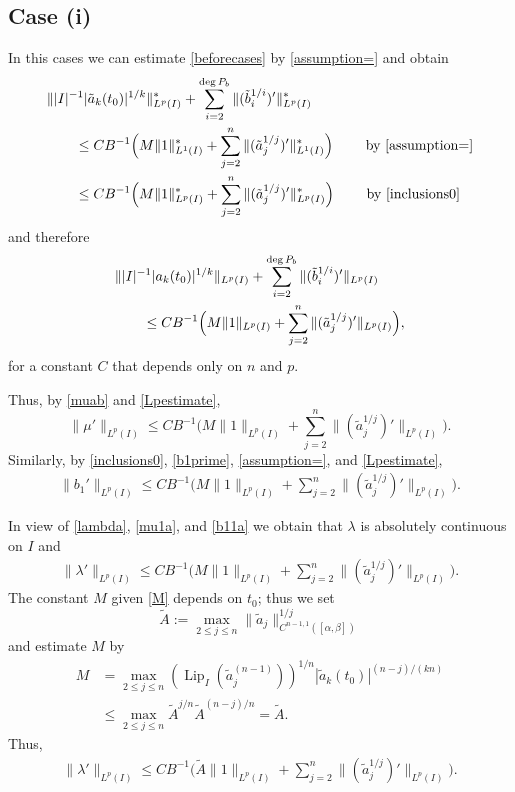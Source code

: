 \documentclass[12pt]{amsart}
\theoremstyle{plain}
\theoremstyle{definition}
\numberwithin{equation}{section}
\let\on=\operatorname
\begin{document}
\subsection*{Case (i)} In this cases we can estimate \eqref{beforecases} by \eqref{assumption=} and obtain
\begin{align*}
  \MoveEqLeft
  \||I|^{-1} |\tilde a_k (t_0)|^{1/k} \|^*_{L^p (I)} + \sum_{i=2}^{\deg P_b} \|(\tilde b_i^{1/i})'\|^*_{L^p(I)} 
  \\
  &\le C B^{-1}  \Big({M} \|1\|^*_{L^1(I)} + \sum_{j=2}^n \|(\tilde a_j^{1/j})'\|^*_{L^1 (I)}\Big) \qquad \text{ by \eqref{assumption=}}
  \\
  &\le C  B^{-1}  \Big({M} \|1\|^*_{L^p(I)} + \sum_{j=2}^n \|(\tilde a_j^{1/j})'\|^*_{L^p (I)}\Big)  \qquad \text{ by \eqref{inclusions0}}
\end{align*}
and therefore 
\begin{align}
  \MoveEqLeft
  \||I|^{-1} |a_k (t_0)|^{1/k} \|_{L^p (I)} + \sum_{i=2}^{\deg P_b} \|(\tilde b_i^{1/i})'\|_{L^p(I)} \notag
  \\
  &\le C B^{-1}   \Big({M}\|1\|_{L^p(I)} + \sum_{j=2}^n \|(\tilde a_j^{1/j})'\|_{L^p (I)}\Big), \label{Lpestimate} 
\end{align}
for a constant $C$ that depends only on $n$ and $p$.

Thus, by \eqref{muab} and \eqref{Lpestimate}, 
\begin{equation} \label{mu1a}
  \|\mu'\|_{L^p(I)} \le C B^{-1} \Big({M} \|1\|_{L^p(I)} + \sum_{j=2}^n \|(\tilde a_j^{1/j})'\|_{L^p (I)}\Big).
\end{equation}
Similarly, by \eqref{inclusions0}, \eqref{b1prime}, \eqref{assumption=}, and \eqref{Lpestimate}, 
\begin{align}  \label{b11a}
    \|b_1'\|_{L^p(I)} \le C B^{-1}  \Big({M} \|1\|_{L^p(I)} + \sum_{j=2}^n \|(\tilde a_j^{1/j})'\|_{L^p (I)}\Big).
\end{align}

In view of \eqref{lambda}, \eqref{mu1a}, and \eqref{b11a} we obtain that ${\lambda}$ is absolutely continuous on $I$ and 
\begin{align*} 
  \|{\lambda}'\|_{L^p(I)} \le C B^{-1}  \Big({M} \|1\|_{L^p(I)} + \sum_{j=2}^n \|(\tilde a_j^{1/j})'\|_{L^p (I)}\Big).
\end{align*}
The constant ${M}$ given \eqref{M} depends on $t_0$; thus we 
set 
\begin{equation} \label{tildeA}
  \tilde A := \max_{2 \le j \le n} \|\tilde a_j\|^{1/j}_{C^{n-1,1}([{\alpha},{\beta}])}
\end{equation}
and 
estimate ${M}$ by
\begin{align*}
  {M} &= \max_{2 \le j\le n}  ({\on{Lip}}_I(\tilde a_j^{(n-1)}))^{1/n} |\tilde a_k (t_0)|^{(n-j)/(kn)}
  \\
  &\le \max_{2 \le j\le n} \tilde A^{j/n} \tilde A^{(n-j)/n} = \tilde A.  
\end{align*}
Thus,
\begin{align} \label{laIA}
  \|{\lambda}'\|_{L^p(I)} \le C B^{-1}  \Big(\tilde A \|1\|_{L^p(I)} + \sum_{j=2}^n \|(\tilde a_j^{1/j})'\|_{L^p (I)}\Big).
\end{align}
\end{document}
